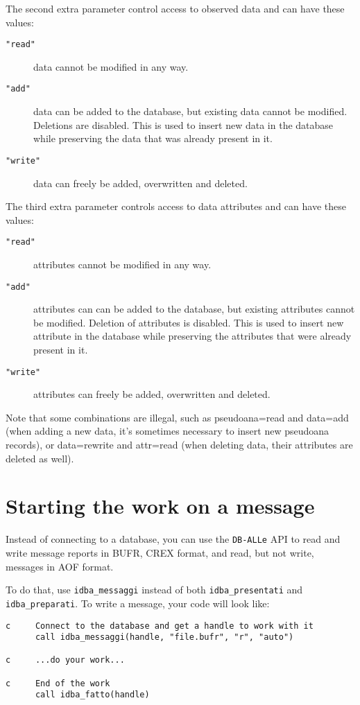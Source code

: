 \documentclass[final,12pt,a4paper,twoside]{book}
\newcommand{\dballe}{{\tt DB-ALLe}}
\begin{document}
The second extra parameter control access to observed data and can have
these values:

\begin{description}
\item[{\tt "read"}] data cannot be modified in any way.
\item[{\tt "add"}] data can be added to the database, but existing data cannot
		   be modified.  Deletions are disabled.  This is used to
		   insert new data in the database while preserving the data
		   that was already present in it.
\item[{\tt "write"}] data can freely be added, overwritten and deleted.
\end{description}

The third extra parameter controls access to data attributes and can have
these values:

\begin{description}
\item[{\tt "read"}] attributes cannot be modified in any way.
\item[{\tt "add"}] attributes can can be added to the database, but existing
		   attributes cannot be modified.  Deletion of attributes is
		   disabled.  This is used to insert new attribute in the
		   database while preserving the attributes that were already
		   present in it.
\item[{\tt "write"}] attributes can freely be added, overwritten and deleted.
\end{description}

Note that some combinations are illegal, such as pseudoana=read and data=add
(when adding a new data, it's sometimes necessary to insert new pseudoana
records), or data=rewrite and attr=read (when deleting data, their attributes
are deleted as well).

\section{Starting the work on a message}

Instead of connecting to a database, you can use the \dballe{} API to read and
write message reports in BUFR, CREX format, and read, but not write, messages
in AOF format.

To do that, use {\tt idba\_messaggi} instead of both {\tt idba\_presentati} and
{\tt idba\_preparati}.  To write a message, your code will look like:

\begin{verbatim}
c     Connect to the database and get a handle to work with it
      call idba_messaggi(handle, "file.bufr", "r", "auto")

c     ...do your work...

c     End of the work
      call idba_fatto(handle)
\end{verbatim}
\end{document}
